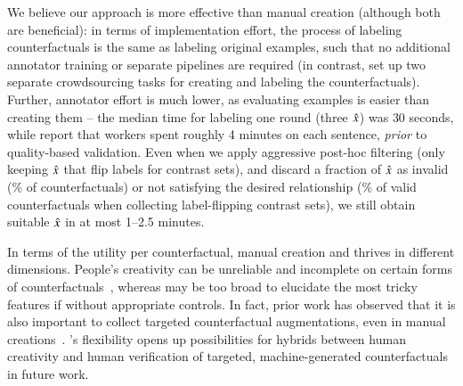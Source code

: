We believe our approach is more effective than manual creation (although both are beneficial): in terms of implementation effort, the process of labeling counterfactuals is the same as labeling original examples, such that no additional annotator training or separate pipelines are required (in contrast, \citet{kaushik2019learning} set up two separate crowdsourcing tasks for creating and labeling the counterfactuals). 
Further, annotator effort is much lower, as evaluating examples is easier than creating them -- the median time for labeling one round (three $\hat{x}$) was $30$ seconds, while \citet{kaushik2019learning} report that workers spent roughly 4 minutes on each \nli sentence, \emph{prior} to quality-based validation.
Even when we apply aggressive post-hoc filtering (\eg only keeping $\hat{x}$ that flip labels for contrast sets), and discard a fraction of $\hat{x}$ as invalid (\% of \nli counterfactuals) or not satisfying the desired relationship (\% of valid \nli counterfactuals when collecting label-flipping contrast sets), we still obtain suitable $\hat{x}$ in at most 1--2.5 minutes.

In terms of the utility per counterfactual, manual creation and \sysname thrives in different dimensions. 
People's creativity can be unreliable and incomplete on certain forms of counterfactuals~\cite{ribeiro2018semantically}, whereas \sysname may be too broad to elucidate the most tricky features if without appropriate controls.
In fact, prior work has observed that it is also important to collect targeted counterfactual augmentations, even in manual creations~\cite{longpre2020effective, Khashabi2020MoreBF}.
\sysname's flexibility opens up possibilities for hybrids between human creativity and human verification of targeted, machine-generated counterfactuals in future work.




